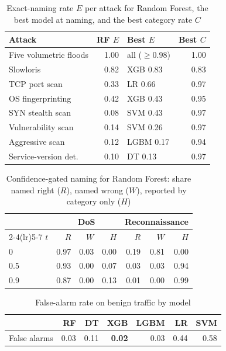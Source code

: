 \documentclass[conference]{IEEEtran}
\begin{document}
\begin{table}[!t]
\caption{Exact-naming rate $E$ per attack for Random Forest, the best model at naming, and the best category rate $C$}
\label{tab:perattack}
\centering
\footnotesize
\begin{tabular}{@{}lrlr@{}}
\toprule
\textbf{Attack} & \textbf{RF $E$} & \textbf{Best $E$} & \textbf{Best $C$} \\
\midrule
Five volumetric floods & 1.00 & all ($\ge 0.98$) & 1.00 \\
Slowloris & 0.82 & XGB 0.83 & 0.83 \\
TCP port scan & 0.33 & LR 0.66 & 0.97 \\
OS fingerprinting & 0.42 & XGB 0.43 & 0.95 \\
SYN stealth scan & 0.08 & SVM 0.43 & 0.97 \\
Vulnerability scan & 0.14 & SVM 0.26 & 0.97 \\
Aggressive scan & 0.12 & LGBM 0.17 & 0.94 \\
Service-version det. & 0.10 & DT 0.13 & 0.97 \\
\bottomrule
\end{tabular}
\end{table}

\begin{table}[!t]
\caption{Confidence-gated naming for Random Forest: share named right ($R$), named wrong ($W$), reported by category only ($H$)}
\label{tab:gate}
\centering
\footnotesize
\begin{tabular}{@{}lrrrrrr@{}}
\toprule
 & \multicolumn{3}{c}{\textbf{DoS}} & \multicolumn{3}{c}{\textbf{Reconnaissance}} \\
\cmidrule(lr){2-4}\cmidrule(lr){5-7}
$t$ & $R$ & $W$ & $H$ & $R$ & $W$ & $H$ \\
\midrule
0   & 0.97 & 0.03 & 0.00 & 0.19 & 0.81 & 0.00 \\
0.5 & 0.93 & 0.00 & 0.07 & 0.03 & 0.03 & 0.94 \\
0.9 & 0.87 & 0.00 & 0.13 & 0.01 & 0.00 & 0.99 \\
\bottomrule
\end{tabular}
\end{table}

\begin{table}[!t]
\caption{False-alarm rate on benign traffic by model}
\label{tab:fa}
\centering
\footnotesize
\begin{tabular}{@{}lrrrrrr@{}}
\toprule
 & \textbf{RF} & \textbf{DT} & \textbf{XGB} & \textbf{LGBM} & \textbf{LR} & \textbf{SVM} \\
\midrule
False alarms & 0.03 & 0.11 & \textbf{0.02} & 0.03 & 0.44 & 0.58 \\
\bottomrule
\end{tabular}
\end{table}
\end{document}
